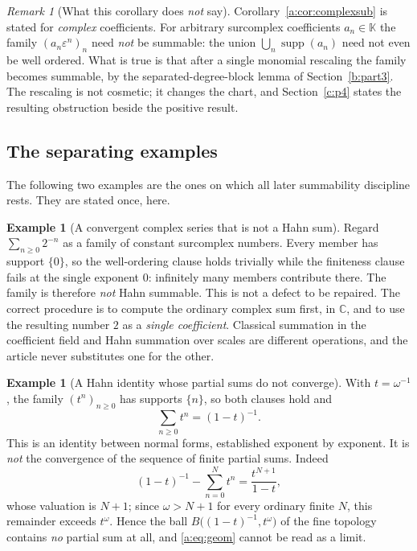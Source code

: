\documentclass[11pt,a4paper]{article}
\numberwithin{equation}{section}
\theoremstyle{definition}
\newtheorem{example}[theorem]{Example}
\theoremstyle{remark}
\newtheorem{remark}[theorem]{Remark}
\theoremstyle{plain}
\newcommand{\K}{\mathbb K}
\newcommand{\CC}{\mathbb C}
\DeclareMathOperator{\supp}{supp}
\newcommand{\tm}{t}
\begin{document}
\begin{remark}[What this corollary does \emph{not} say]\label{a:rem:nosurcoeff}
Corollary~\ref{a:cor:complexsub} is stated for \emph{complex}
coefficients.  For arbitrary surcomplex coefficients $a_n\in\K$ the
family $(a_n\varepsilon^{n})_n$ need \emph{not} be summable: the union
$\bigcup_n\supp(a_n)$ need not even be well ordered.  What is true is
that after a single monomial rescaling the family becomes summable, by
the separated-degree-block lemma of Section~\ref{b:part3}.  The rescaling is not
cosmetic; it changes the chart, and Section~\ref{c:p4} states the resulting
obstruction beside the positive result.
\end{remark}

\subsection{The separating examples}\label{a:sec:separating}

The following two examples are the ones on which all later summability
discipline rests.  They are stated once, here.

\begin{example}[A convergent complex series that is not a Hahn sum]\label{a:ex:notsummable}
Regard $\sum_{n\ge0}2^{-n}$ as a family of constant surcomplex numbers.
Every member has support $\{0\}$, so the well-ordering clause holds
trivially while the finiteness clause fails at the single exponent $0$:
infinitely many members contribute there.  The family is therefore
\emph{not} Hahn summable.  This is not a defect to be repaired.  The
correct procedure is to compute the ordinary complex sum first, in
$\CC$, and to use the resulting number $2$ as a \emph{single
coefficient}.  Classical summation in the coefficient field and Hahn
summation over scales are different operations, and the article never
substitutes one for the other.
\end{example}

\begin{example}[A Hahn identity whose partial sums do not
converge]\label{a:ex:geometric}
With $\tm=\omega^{-1}$, the family $(\tm^{n})_{n\ge0}$ has supports
$\{n\}$, so both clauses hold and
\begin{equation}\label{a:eq:geom}
 \sum_{n\ge0}\tm^{n}=(1-\tm)^{-1}.
\end{equation}
This is an identity between normal forms, established exponent by
exponent.  It is \emph{not} the convergence of the sequence of finite
partial sums.  Indeed
\[
 (1-\tm)^{-1}-\sum_{n=0}^{N}\tm^{n}=\frac{\tm^{N+1}}{1-\tm},
\]
whose valuation is $N+1$; since $\omega>N+1$ for every ordinary finite
$N$, this remainder exceeds $\tm^{\omega}$.  Hence the ball
$B\bigl((1-\tm)^{-1},\tm^{\omega}\bigr)$ of the fine topology contains
\emph{no} partial sum at all, and \eqref{a:eq:geom} cannot be read as a
limit.
\end{example}
\end{document}
